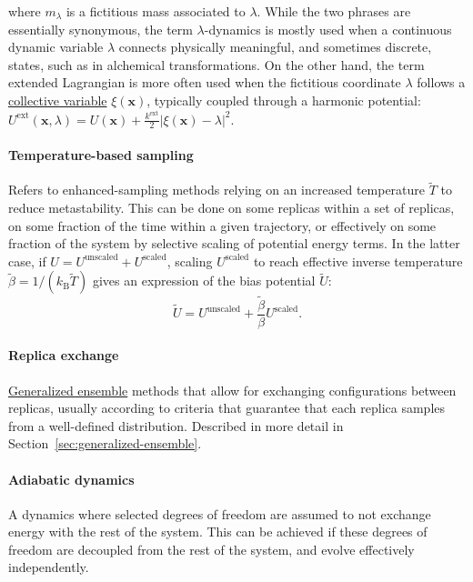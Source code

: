 \documentclass[9pt,review]{livecoms}
\newcommand{\vx}{\mathbf{x}}
\begin{document}
where $m_\lambda$ is a fictitious mass associated to $\lambda$.
While the two phrases are essentially synonymous, the term $\lambda$-dynamics is mostly used when a continuous dynamic variable $\lambda$ connects physically meaningful, and sometimes discrete, states, such as in alchemical transformations.
On the other hand, the term extended Lagrangian is more often used when  the fictitious coordinate $\lambda$ follows a \hyperlink{ref:CV} {collective variable} $\xi(\vx)$, typically coupled through a harmonic potential: $U^\text{ext}(\vx, \lambda) = U(\vx) + \frac{k^\mathrm{ext}}{2}|\xi(\vx)-\lambda|^2$.


\paragraph{Temperature-based sampling} Refers to enhanced-sampling methods relying on an increased temperature $\tilde T$ to reduce metastability. This can be done on some replicas within a set of replicas, on some fraction of the time within a given trajectory, or effectively on some fraction of the system by selective scaling of potential energy terms.
In the latter case, if $U = U^\mathrm{unscaled} + U^\mathrm{scaled}$, scaling $U^\mathrm{scaled}$ to reach effective inverse temperature $\tilde \beta = 1/(k_\mathrm{B} \tilde T)$ gives an expression of the bias potential $\tilde U$:
\begin{equation}
\tilde U = U^\mathrm{unscaled} + \frac{\tilde \beta}{\beta} U^\mathrm{scaled}.
\end{equation}


\hypertarget{ref:ReplEx} {\paragraph{Replica exchange}} \hyperlink{ref:GenEns} {Generalized ensemble} methods that allow for exchanging configurations between replicas, usually according to criteria that guarantee that each replica samples from a well-defined distribution. Described in more detail in Section~\ref{sec:generalized-ensemble}.

\hypertarget{ref:AdiabaticDyn} {\paragraph{Adiabatic dynamics}}
A dynamics where selected degrees of freedom are assumed to not exchange energy with the rest of the system.
This can be achieved if these degrees of freedom are decoupled from the rest of the system, and evolve effectively independently.
\end{document}
